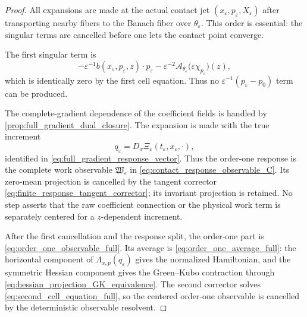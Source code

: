 \documentclass[12pt, letterpaper]{amsart}
\newcommand{\Acal}{\mathcal{A}}
\theoremstyle{plain}
\theoremstyle{definition}
\theoremstyle{remark}
\begin{document}
\begin{proof}
All expansions are made at the actual contact jet
$(x_\varepsilon,p_\varepsilon,X_\varepsilon)$ after transporting nearby fibers
to the Banach fiber over $\theta_\varepsilon$.  This order is essential: the
singular terms are cancelled before one lets the contact point converge.

The first singular term is
\begin{equation}
    -\varepsilon^{-1}b(x_\varepsilon,p_\varepsilon,z)\cdot p_\varepsilon
    -\varepsilon^{-2}\Acal_{\theta_\varepsilon}
       \big(\varepsilon\chi_{p_\varepsilon}\big)(z),
\end{equation}
which is identically zero by the first cell equation.  Thus no
$\varepsilon^{-1}(p_\varepsilon-p_0)$ term can be produced.

The complete-gradient dependence of the coefficient fields is handled by
\cref{prop:full_gradient_dual_closure}.  The expansion is made with the true
increment
\begin{equation}
    q_\varepsilon=D_x\Xi_\varepsilon(t_\varepsilon,x_\varepsilon,\cdot),
\end{equation}
identified in \eqref{eq:full_gradient_response_vector}.  Thus the order-one
response is the complete work observable $\mathfrak W_\varepsilon$ in
\eqref{eq:contact_response_observable_C}.  Its zero-mean projection is cancelled
by the tangent corrector \eqref{eq:finite_response_tangent_corrector}; its
invariant projection is retained.  No step asserts that the raw coefficient
connection or the physical work term is separately centered for a $z$-dependent
increment.

After the first cancellation and the response split, the order-one part is
\eqref{eq:order_one_observable_full}.  Its average is
\eqref{eq:order_one_average_full}: the horizontal component of
$\Lambda_{x,p}(q_\varepsilon)$ gives the normalized Hamiltonian, and the
symmetric Hessian component gives the Green--Kubo contraction through
\eqref{eq:hessian_projection_GK_equivalence}.  The second corrector solves
\eqref{eq:second_cell_equation_full}, so the centered order-one observable is
cancelled by the deterministic observable resolvent.


\end{proof}
\end{document}
